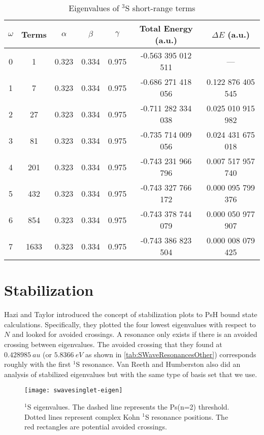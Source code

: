 \documentclass[Dissertation.tex]{subfiles}
\begin{document}
\setlength{\abovecaptionskip}{6pt}   %
\setlength{\belowcaptionskip}{6pt}   %
\begin{table}
\centering
\begin{tabular}{c c c c c c c}
\toprule
$\omega$ & Terms & $\alpha$ & $\beta$ & $\gamma$ & Total Energy (a.u.) & $\Delta E$ (a.u.) \\ [0.5ex]
\midrule
0 & 1    & 0.323 & 0.334 & 0.975 & -0.563 395 012 511 & --- \\
1 & 7    & 0.323 & 0.334 & 0.975 & -0.686 271 418 056 & 0.122 876 405 545 \\
2 & 27   & 0.323 & 0.334 & 0.975 & -0.711 282 334 038 & 0.025 010 915 982 \\
3 & 81   & 0.323 & 0.334 & 0.975 & -0.735 714 009 056 & 0.024 431 675 018 \\
4 & 201  & 0.323 & 0.334 & 0.975 & -0.743 231 966 796 & 0.007 517 957 740 \\
5 & 432  & 0.323 & 0.334 & 0.975 & -0.743 327 766 172 & 0.000 095 799 376 \\
6 & 854  & 0.323 & 0.334 & 0.975 & -0.743 378 744 079 & 0.000 050 977 907 \\
7 & 1633 & 0.323 & 0.334 & 0.975 & -0.743 386 823 504 & 0.000 008 079 425 \\
\bottomrule
\end{tabular}
\caption{Eigenvalues of $^3$S short-range terms}
\label{tab:BoundEnergyTodd3}
\end{table}


\section{Stabilization}

Hazi and Taylor \cite{Hazi1970} introduced the concept of stabilization plots 
to PsH bound state calculations.
Specifically, they plotted 
the four lowest eigenvalues with respect to $N$ and looked for avoided 
crossings. A resonance only exists if there is an avoided crossing between 
eigenvalues. The avoided crossing that they found at $\SI{0.428 985}{au}$ (or 
$\SI{5.8366}{eV}$ as shown in \cref{tab:SWaveResonancesOther}) corresponds 
roughly with the first $^1$S resonance. Van Reeth and Humberston \cite{
VanReeth2004} also did an analysis of stabilized eigenvalues but with the 
same type of basis set that we use.

\begin{figure}
	\centering
	\texttt{[image: swavesinglet-eigen]}
	\caption[$^1$S eigenvalues]{$^1$S eigenvalues. The dashed line represents the Ps(n=2) threshold. Dotted lines represent complex Kohn $^1$S resonance positions. The red rectangles are potential avoided crossings.}
	\label{fig:swavesinglet-eigen}
\end{figure}
\end{document}
